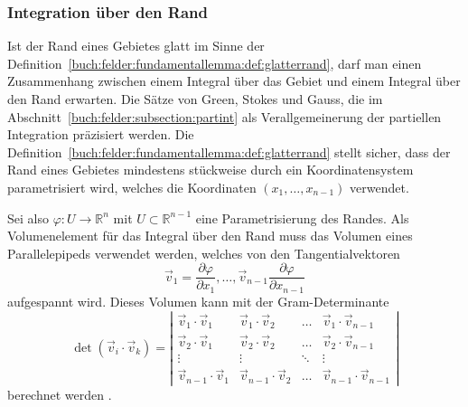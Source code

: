 \subsubsection{Integration über den Rand}
Ist der Rand eines Gebietes glatt im Sinne der
Definition~\ref{buch:felder:fundamentallemma:def:glatterrand},
darf man einen Zusammenhang zwischen einem Integral über das Gebiet
und einem Integral über den Rand erwarten.
Die Sätze von Green, Stokes und Gauss, die im
Abschnitt~\ref{buch:felder:subsection:partint} als Verallgemeinerung
der partiellen Integration präzisiert werden.
Die Definition~\ref{buch:felder:fundamentallemma:def:glatterrand}
stellt sicher, dass der Rand eines Gebietes mindestens stückweise
durch ein Koordinatensystem parametrisiert wird, welches die
Koordinaten $(x_1,\dots,x_{n-1})$ verwendet.

Sei also $\varphi\colon U\to\mathbb{R}^n$ mit $U\subset\mathbb{R}^{n-1}$
eine Parametrisierung des Randes.
Als Volumenelement für das Integral über den Rand muss das Volumen
eines Parallelepipeds verwendet werden, welches von den Tangentialvektoren
\[
\vec{v}_1
=
\frac{\partial\varphi}{\partial x_1},
\dots,
\vec{v}_{n-1}
\frac{\partial\varphi}{\partial x_{n-1}}
\]
aufgespannt wird.
Dieses Volumen kann mit der Gram-Determinante
\[
\det(\vec{v}_i\cdot\vec{v}_k)
=
\left|
\begin{matrix}
\vec{v}_1\cdot\vec{v}_1
	& \vec{v}_1\cdot\vec{v}_2
		& \dots
			& \vec{v}_1\cdot\vec{v}_{n-1}\\
\vec{v}_2\cdot\vec{v}_1
	& \vec{v}_2\cdot\vec{v}_2
		& \dots
			& \vec{v}_2\cdot\vec{v}_{n-1}\\
\vdots&\vdots&\ddots&\vdots\\
\vec{v}_{n-1}\cdot\vec{v}_1
	& \vec{v}_{n-1}\cdot\vec{v}_2
		& \dots
			& \vec{v}_{n-1}\cdot\vec{v}_{n-1}
\end{matrix}
\right|
\]
berechnet werden \cite{buch:linalg}.




